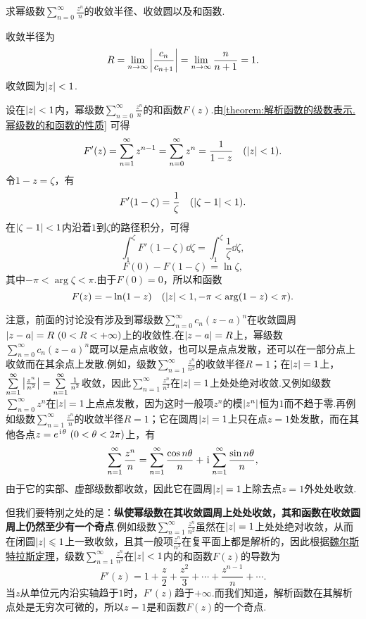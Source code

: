\begin{example}
求幂级数\(\sum\limits_{n=0}^{\infty} \frac{z^n}{n}\)的收敛半径、收敛圆以及和函数.
\begin{solution}
收敛半径为\[
R = \lim\limits_{n\to\infty} \abs{\frac{c_n}{c_{n+1}}} = \lim\limits_{n\to\infty} \frac{n}{n+1} = 1.
\]收敛圆为\(\abs{z} < 1\).

设在\(\abs{z} < 1\)内，幂级数\(\sum\limits_{n=0}^{\infty} \frac{z^n}{n}\)的和函数\(F(z)\).由\cref{theorem:解析函数的级数表示.幂级数的和函数的性质} 可得\[
F'(z) = \sum\limits_{n=1}^{\infty} z^{n-1}
= \sum\limits_{n=0}^{\infty} z^n
= \frac{1}{1-z}
\quad(\abs{z} < 1).
\]令\(1-z = \zeta\)，有\[
F'(1-\zeta) = \frac{1}{\zeta}
\quad(\abs{\zeta-1}<1).
\]在\(\abs{\zeta-1}<1\)内沿着\(1\)到\(\zeta\)的路径积分，可得\[
\int_1^{\zeta} F'(1-\zeta) \dd{\zeta}
= \int_1^{\zeta} \frac{1}{\zeta} \dd{\zeta},
\]\[
F(0) - F(1-\zeta)
= \ln \zeta,
\]其中\(-\pi < \arg \zeta < \pi\).由于\(F(0) = 0\)，所以和函数\[
F(z) = -\ln(1-z)
\quad(\abs{z}<1, -\pi < \arg(1-z) < \pi).
\]
\end{solution}
\end{example}
注意，前面的讨论没有涉及到幂级数\(\sum\limits_{n=0}^{\infty} c_n (z-a)^n\)在收敛圆周\(\abs{z-a}=R\ (0<R<+\infty)\)上的收敛性.在\(\abs{z-a}=R\)上，幂级数\(\sum\limits_{n=0}^{\infty} c_n (z-a)^n\)既可以是点点收敛，也可以是点点发散，还可以在一部分点上收敛而在其余点上发散.例如，级数\(\sum\limits_{n=1}^{\infty} \frac{z^n}{n^2}\)的收敛半径\(R=1\)；在\(\abs{z}=1\)上，\(\sum\limits_{n=1}^{\infty} \abs{\frac{z^n}{n^2}} = \sum\limits_{n=1}^{\infty} \frac{1}{n^2}\)收敛，因此\(\sum\limits_{n=1}^{\infty} \frac{z^n}{n^2}\)在\(\abs{z}=1\)上处处绝对收敛.又例如级数\(\sum\limits_{n=0}^{\infty} z^n\)在\(\abs{z}=1\)上点点发散，因为这时一般项\(z^n\)的模\(\abs{z^n}\)恒为\(1\)而不趋于零.再例如级数\(\sum\limits_{n=1}^{\infty} \frac{z^n}{n}\)的收敛半径\(R=1\)；它在圆周\(\abs{z}=1\)上只在点\(z=1\)处发散，而在其他各点\(z = e^{\iu\theta}\ (0<\theta<2\pi)\)上，有\[
\sum\limits_{n=1}^{\infty} \frac{z^n}{n}
= \sum\limits_{n=1}^{\infty} \frac{\cos n\theta}{n}
+ \kern1pt\mathrm{i}\kern1pt\sum\limits_{n=1}^{\infty} \frac{\sin n\theta}{n},
\]由于它的实部、虚部级数都收敛，因此它在圆周\(\abs{z}=1\)上除去点\(z=1\)外处处收敛.

但我们要特别之处的是：\textbf{纵使幂级数在其收敛圆周上处处收敛，其和函数在收敛圆周上仍然至少有一个奇点}.例如级数\(\sum\limits_{n=1}^{\infty} \frac{z^n}{n^2}\)虽然在\(\abs{z}=1\)上处处绝对收敛，从而在闭圆\(\abs{z}\leqslant1\)上一致收敛，且其一般项\(\frac{z^n}{n^2}\)在复平面上都是解析的，因此根据\hyperref[theorem:解析函数的级数表示.魏尔斯特拉斯定理]{魏尔斯特拉斯定理}，级数\(\sum\limits_{n=1}^{\infty} \frac{z^n}{n^2}\)在\(\abs{z}<1\)内的和函数\(F(z)\)的导数为\[
F'(z) = 1 + \frac{z}{2} + \frac{z^2}{3} + \dotsb + \frac{z^{n-1}}{n} + \dotsb.
\]当\(z\)从单位元内沿实轴趋于\(1\)时，\(F'(z)\)趋于\(+\infty\).而我们知道，解析函数在其解析点处是无穷次可微的，所以\(z=1\)是和函数\(F(z)\)的一个奇点.

